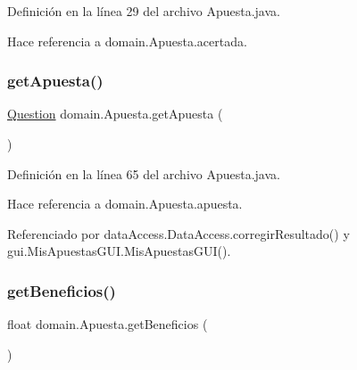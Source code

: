 Definición en la línea 29 del archivo Apuesta.\+java.


\begin{DoxyCode}{0}

\end{DoxyCode}


Hace referencia a domain.\+Apuesta.\+acertada.

\mbox{\label{classdomain_1_1Apuesta_aa9aa7f1a5d45ecec091814d68d4ab5c8}} 
\subsubsection{\texorpdfstring{getApuesta()}{getApuesta()}}
{\footnotesize\ttfamily \mbox{\hyperlink{classdomain_1_1Question}{Question}} domain.\+Apuesta.\+get\+Apuesta (\begin{DoxyParamCaption}{ }\end{DoxyParamCaption})}



Definición en la línea 65 del archivo Apuesta.\+java.


\begin{DoxyCode}{0}

\end{DoxyCode}


Hace referencia a domain.\+Apuesta.\+apuesta.



Referenciado por data\+Access.\+Data\+Access.\+corregir\+Resultado() y gui.\+Mis\+Apuestas\+G\+U\+I.\+Mis\+Apuestas\+G\+U\+I().

\mbox{\label{classdomain_1_1Apuesta_aa228aed3dfebe83dbf9a0f15b7d339de}} 
\subsubsection{\texorpdfstring{getBeneficios()}{getBeneficios()}}
{\footnotesize\ttfamily float domain.\+Apuesta.\+get\+Beneficios (\begin{DoxyParamCaption}{ }\end{DoxyParamCaption})}



